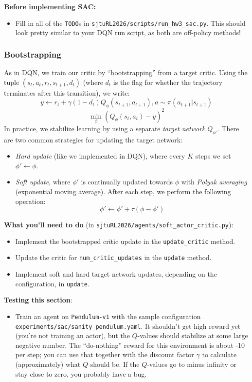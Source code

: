 \textbf{Before implementing SAC:}
\begin{itemize}
    \item Fill in all of the \verb|TODO|s in \verb|sjtuRL2026/scripts/run_hw3_sac.py|. This should look pretty similar to your DQN run script, as both are off-policy methods!
\end{itemize}

\subsubsection{Bootstrapping}
As in DQN, we train our critic by ``bootstrapping'' from a target critic. Using the tuple $(s_t, a_t, r_t, s_{t+1}, d_{t})$ (where $d_t$ is the flag for whether the trajectory terminates after this transition), we write:
\[y \gets r_t + \gamma (1-d_t) Q_\phi(s_{t+1}, a_{t+1}), a \sim \pi(a_{t+1}|s_{t+1})\]
\[\min_\phi (Q_\phi(s_t, a_t) - y)^2\]
In practice, we stabilize learning by using a separate \textit{target network} $Q_{\phi'}$. There are two common strategies for updating the target network:
\begin{itemize}
    \item \textit{Hard update} (like we implemented in DQN), where every $K$ steps we set $\phi' \gets \phi$.
    \item \textit{Soft update}, where $\phi'$ is continually updated towards $\phi$ with \textit{Polyak averaging} (exponential moving average). After each step, we perform the following operation:
    \[\phi' \gets \phi' + \tau(\phi-\phi')\]
\end{itemize}

\textbf{What you'll need to do} (in \verb|sjtuRL2026/agents/soft_actor_critic.py|):
\begin{itemize}
    \item Implement the bootstrapped critic update in the \verb|update_critic| method.
    \item Update the critic for \verb|num_critic_updates| in the \verb|update| method.
    \item Implement soft and hard target network updates, depending on the configuration, in \verb|update|.
\end{itemize}

\textbf{Testing this section}:
\begin{itemize}
    \item Train an agent on \verb|Pendulum-v1| with the sample configuration \verb|experiments/sac/sanity_pendulum.yaml|. It shouldn't get high reward yet (you're not training an actor), but the $Q$-values should stabilize at some large negative number. The ``do-nothing'' reward for this environment is about -10 per step; you can use that together with the discount factor $\gamma$ to calculate (approximately) what $Q$ should be. If the $Q$-values go to minus infinity or stay close to zero, you probably have a bug.
\end{itemize}

